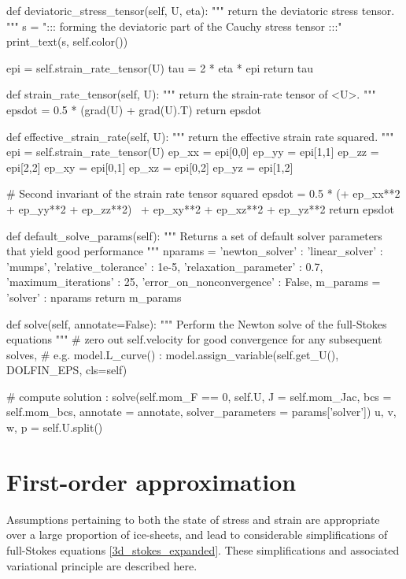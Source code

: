 \begin{python}[label=cslvr_full_stokes, caption={\CSLVR source code contained in the \texttt{MomentumDukowiczStokes} class.}]
def deviatoric_stress_tensor(self, U, eta):
  """
  return the deviatoric stress tensor.
  """
  s   = "::: forming the deviatoric part of the Cauchy stress tensor :::"
  print_text(s, self.color())

  epi = self.strain_rate_tensor(U)
  tau = 2 * eta * epi
  return tau

def strain_rate_tensor(self, U):
  """
  return the strain-rate tensor of <U>.
  """
  epsdot = 0.5 * (grad(U) + grad(U).T)
  return epsdot

def effective_strain_rate(self, U):
  """
  return the effective strain rate squared.
  """
  epi    = self.strain_rate_tensor(U)
  ep_xx  = epi[0,0]
  ep_yy  = epi[1,1]
  ep_zz  = epi[2,2]
  ep_xy  = epi[0,1]
  ep_xz  = epi[0,2]
  ep_yz  = epi[1,2]
  
  # Second invariant of the strain rate tensor squared
  epsdot = 0.5 * (+ ep_xx**2 + ep_yy**2 + ep_zz**2) \
                  + ep_xy**2 + ep_xz**2 + ep_yz**2
  return epsdot

def default_solve_params(self):
  """ 
  Returns a set of default solver parameters that yield good performance
  """
  nparams = {'newton_solver' :
            {
              'linear_solver'            : 'mumps',
              'relative_tolerance'       : 1e-5,
              'relaxation_parameter'     : 0.7,
              'maximum_iterations'       : 25,
              'error_on_nonconvergence'  : False,
            }}
  m_params  = {'solver'      : nparams}
  return m_params

def solve(self, annotate=False):
  """ 
  Perform the Newton solve of the full-Stokes equations 
  """
  # zero out self.velocity for good convergence for any subsequent solves,
  # e.g. model.L_curve() :
  model.assign_variable(self.get_U(), DOLFIN_EPS, cls=self)
  
  # compute solution :
  solve(self.mom_F == 0, self.U, J = self.mom_Jac, bcs = self.mom_bcs,
        annotate = annotate, solver_parameters = params['solver'])
  u, v, w, p = self.U.split()
  
\end{python}




\section{First-order approximation} \label{ssn_first_order}

Assumptions pertaining to both the state of stress and strain are appropriate over a large proportion of ice-sheets, and lead to considerable simplifications of full-Stokes equations \cref{3d_stokes_expanded}.  These simplifications and associated variational principle are described here.

